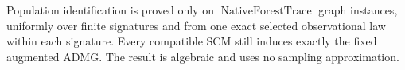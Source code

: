 Population identification is proved only on \(\operatorname{NativeForestTrace}\) graph instances, uniformly over finite signatures and from one exact selected observational law within each signature. Every compatible SCM still induces exactly the fixed augmented ADMG. The result is algebraic and uses no sampling approximation.